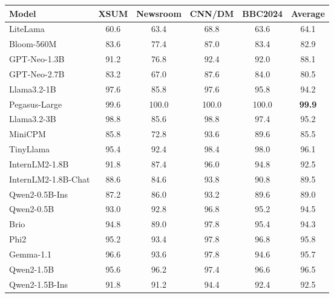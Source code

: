 \begin{table}[]
\begin{adjustbox}{max width=1\columnwidth}
\begin{tabular}{lccccc}
\hline
Model              & XSUM &Newsroom & CNN/DM & BBC2024 & Average \\ \hline
LiteLama           & 60.6 & 63.4    & 68.8   & 63.6    & 64.1    \\
Bloom-560M         & 83.6 & 77.4                          & 87.0   & 83.4    & 82.9    \\
GPT-Neo-1.3B       & 91.2 & 76.8                          & 92.4   & 92.0    & 88.1    \\
GPT-Neo-2.7B       & 83.2 & 67.0                          & 87.6   & 84.0    & 80.5    \\
Llama3.2-1B        & 97.6 & 85.8                         & 97.6  & 95.8      & 94.2    \\
Pegasus-Large      & 99.6 & 100.0                         & 100.0  & 100.0   & \textbf{99.9}    \\
Llama3.2-3B        & 98.8 & 85.6                         & 98.8    & 97.4    & 95.2    \\
MiniCPM            & 85.8 & 72.8                          & 93.6   & 89.6    & 85.5    \\
TinyLlama          & 95.4 & 92.4                          & 98.4   & 98.0    & 96.1    \\
InternLM2-1.8B     & 91.8 & 87.4                          & 96.0   & 94.8    & 92.5    \\
InternLM2-1.8B-Chat & 88.6 & 84.6                          & 93.8   & 90.8    & 89.5    \\
Qwen2-0.5B-Ins     & 87.2 & 86.0                          & 93.2   & 89.6    & 89.0    \\
Qwen2-0.5B         & 93.0 & 92.8                          & 96.8   & 95.2    & 94.5    \\
Brio               & 94.8 & 89.0                          & 97.8   & 95.4    & 94.3    \\
Phi2               & 95.2 & 93.4                          & 97.8   & 96.8    & 95.8    \\
Gemma-1.1          & 96.6 & 93.6                          & 97.8   & 94.6    & 95.7    \\
Qwen2-1.5B         & 95.6 & 96.2                          & 97.4   & 96.6    & 96.5    \\
Qwen2-1.5B-Ins     & 91.8 & 91.2                          & 94.4   & 92.4    & 92.5    \\

\end{tabular}
\end{adjustbox}
\end{table}
